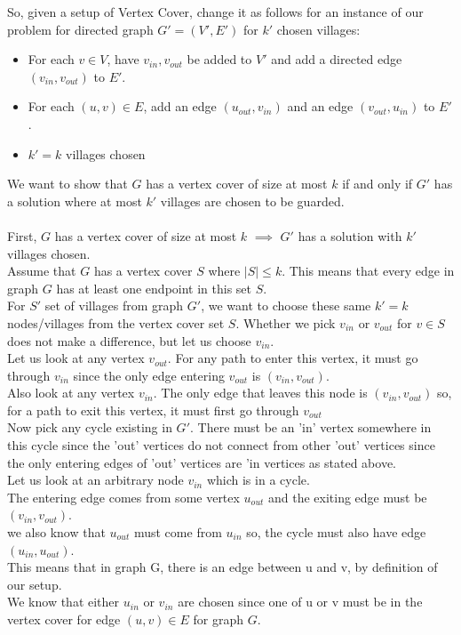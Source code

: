 \documentclass{article}
\begin{document}
\begin{enumerate}
    So, given a setup of Vertex Cover, change it as follows for an instance of our problem for directed graph $G' = (V', E')$ for $k'$ chosen villages:
    \begin{itemize}
        \item For each $v \in V$, have $v_{in}, v_{out}$ be added to $V'$ and add a directed edge $(v_{in}, v_{out})$ to $E'$.
        \item For each $(u, v) \in E$, add an edge $(u_{out}, v_{in})$ and an edge $(v_{out}, u_{in})$ to $E'$.
        \item $k' = k$ villages chosen
    \end{itemize}
    We want to show that $G$ has a vertex cover of size at most $k$ if and only if $G'$ has a solution where at most $k'$ villages are chosen to be guarded.\\
    \\
    First, $G$ has a vertex cover of size at most $k$ $\implies$ $G'$ has a solution with $k'$ villages chosen.\\
    Assume that $G$ has a vertex cover $S$ where $|S| \leq k$. This means that every edge in graph $G$ has at least one endpoint in this set $S$.\\
    For $S'$ set of villages from graph $G'$, we want to choose these same $k' = k$ nodes/villages from the vertex cover set $S$. Whether we pick $v_{in}$ or $v_{out}$ for $v \in S$ does not make a difference, but let us choose $v_{in}$.\\
    
    Let us look at any vertex $v_{out}$. For any path to enter this vertex, it must go through $v_{in}$ since the only edge entering $v_{out}$ is $(v_{in}, v_{out})$.\\
    Also look at any vertex $v_{in}$. The only edge that leaves this node is $(v_{in}, v_{out})$ so, for a path to exit this vertex, it must first go through $v_{out}$\\
    Now pick any cycle existing in $G'$. There must be an 'in' vertex somewhere in this cycle since the 'out' vertices do not connect from other 'out' vertices since the only entering edges of 'out' vertices are 'in vertices as stated above.\\
    
    Let us look at an arbitrary node $v_{in}$ which is in a cycle.\\
    The entering edge comes from some vertex $u_{out}$ and the exiting edge must be $(v_{in}, v_{out})$.\\
    we also know that $u_{out}$ must come from $u_{in}$ so, the cycle must also have edge $(u_{in}, u_{out})$.\\
    This means that in graph G, there is an edge between u and v, by definition of our setup.\\
    We know that either $u_{in}$ or $v_{in}$ are chosen since one of u or v must be in the vertex cover for edge $(u, v) \in E$ for graph $G$.\\
    

\end{enumerate}
\end{document}

